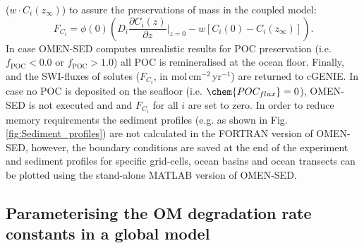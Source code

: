 \documentclass[gmd, manuscript]{copernicus}
\begin{document}
($w \cdot C_i(z_\infty)$) to assure the preservations of mass in the coupled model:
\begin{equation}
 F_{C_i} = \phi(0) \left(D_i \frac{\partial C_i(z)}{\partial z}\bigg\rvert_{z=0} - w \left[ C_i(0) - C_i(z_\infty) \right]\right).
\end{equation}
In case OMEN-SED computes unrealistic results for POC preservation (i.e. $f_{\mathrm{POC}} < 0.0$ or $f_{\mathrm{POC}} > 1.0$) all POC is remineralised at the ocean floor. 
Finally,  and the SWI-fluxes of solutes ($F_{C_i}$, in mol\,cm$^{-2}$\,yr$^{-1}$) are returned to cGENIE. 
In case no POC is deposited on the seafloor (i.e. $\chem{POC_{flux}}=0$), OMEN-SED is not executed and  and $F_{C_i}$ for all $i$ are set to zero. 
In order to reduce memory requirements the sediment profiles (e.g. as shown in Fig. \ref{fig:Sediment_profiles}) are not calculated in the FORTRAN version of OMEN-SED, 
however, the boundary conditions are saved at the end of the experiment and sediment profiles for specific grid-cells, ocean basins and ocean transects can be plotted 
using the stand-alone MATLAB version of OMEN-SED.


\subsection{Parameterising the OM degradation rate constants in a global model}\label{subsec:Parameterising_OM_rate_const}
\end{document}

